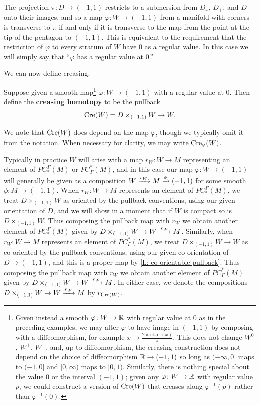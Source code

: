 The projection $\pi:D \to (-1,1)$ restricts to a submersion from $D_x$, $D_+$, and $D_-$ onto their images, and so a map $\varphi: W \to (-1,1)$ from a manifold with corners is transverse to $\pi$ if and only if it is transverse to the map from the point at the tip of the pentagon to $(-1,1)$. This is equivalent to the requirement that the restriction of $\varphi$ to every stratum of $W$ have $0$ as a regular value. In this case we will simply say that ``$\varphi$ has a regular value at $0$.''

We can now define creasing.

\begin{definition}
 Suppose given a smooth map\footnote{Given instead a smooth $\varphi \colon W \to \mathbb{R}$ with regular value at $0$ as in the preceding examples, we may alter $\varphi$ to have image in $(-1,1)$ by composing with a diffeomorphism, for example $x \to \frac{2\arctan(x)}{\pi}$. This does not change $W^0$, $W^+$, $W^-$, and, up to diffeomorphism, the creasing construction does not depend on the choice of diffeomorphism $\mathbb{R} \to (-1,1)$ so long as $(-\infty,0]$ maps to $(-1,0]$ and $[0,\infty)$ maps to $[0,1)$. Similarly, there is nothing special about the value $0$ or the interval $(-1,1)$; given any $\varphi \colon W \to \mathbb{R}$ with regular value $p$, we could construct a version of $\mathrm{Cre}(W)$ that creases along $\varphi^{-1}(p)$ rather than $\varphi^{-1}(0)$.
} $\varphi \colon W \to (-1,1)$ with a regular value at $0$. Then define the \textbf{creasing homotopy} to be the pullback
$$\mathrm{Cre}(W) = D\times_{(-1,1)} W \to W.$$

We note that
$\mathrm{Cre}(W)$ does depend on the map $\varphi$, though we typically omit it from the notation. When necessary for clarity, we may write $\mathrm{Cre}_\varphi(W)$.

Typically in practice $W$ will arise with a map $r_W \colon W \to M$ representing an element of $PC_*^\Gamma(M)$ or $PC^*_\Gamma(M)$, and in this case our map $\varphi: W \to (-1,1)$ will generally be given as a composition
 $W \xrightarrow{r_W}M \xrightarrow{\phi} (-1,1)$ for some smooth $\phi \colon M \to (-1,1)$. When $r_W \colon W \to M$ represents an element of $PC_*^\Gamma(M)$, we treat $D\times_{(-1,1)} W$ as oriented by the pullback conventions, using our given orientation of $D$, and we will show in a moment that if $W$ is compact so is $D\times_{(-1,1)} W$. Thus composing the pullback map with $r_W$ we obtain another element of $PC_*^\Gamma(M)$ given by $D\times_{(-1,1)} W \to W \xrightarrow{r_W}M$. Similarly, when $r_W \colon W \to M$ represents an element of $PC^*_\Gamma(M)$, we treat $D\times_{(-1,1)} W \to W$ as co-oriented by the pullback conventions, using our given co-orientation of $D \to (-1,1)$, and this is a proper map by \cref{L: co-orientable pullback}.
Thus composing the pullback map with $r_W$ we obtain another element of $PC^*_\Gamma(M)$ given by $D\times_{(-1,1)} W \to W \xrightarrow{r_W}M$. In either case, we denote the compositions $D\times_{(-1,1)} W \to W \xrightarrow{r_W}M$ by $r_{\mathrm{Cre}(W)}$.


\end{definition}
